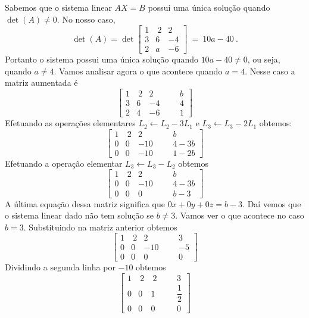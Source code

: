 \begin{solution}  Sabemos que o sistema linear $AX=B$ possui uma única solução quando $\det(A) \neq 0$. No nosso caso,
$$ \det(A) = \det\left[\begin{array}{rrr}
  1 & \  2  &   2  \\
  3 &    6  &  -4  \\ 
  2 &    a  &  -6  \end{array}\right]\ =\ 10a-40\ . $$
Portanto o sistema possui uma única solução quando $10a-40 \neq 0$, ou seja, quando $a\neq 4$.
Vamos analisar agora o que acontece quando $a=4$. Nesse caso a matriz aumentada é
$$ \left[\begin{array}{rrrr|rr}
  1 & \ 2 &    2 & & &   b  \\
  3 &   6 &   -4 & & &   4  \\ 
  2 &   4 &   -6 & & &   1  \end{array}\right] $$
Efetuando as operações elementares $L_2 \leftarrow L_2 - 3L_1$ e $L_3 \leftarrow L_3 - 2L_1$ obtemos:
$$ \left[\begin{array}{rrrr|rc}
  1 & \ 2 &     2 & & &   b  \\
  0 &   0 &   -10 & & &   4-3b  \\ 
  0 &   0 &   -10 & & &   1-2b  \end{array}\right] $$
Efetuando a operação elementar $L_3 \leftarrow L_3 - L_2$ obtemos
$$ \left[\begin{array}{rrrr|rc}
  1 & \ 2 &     2 & & &   b  \\
  0 &   0 &   -10 & & &   4-3b  \\ 
  0 &   0 &     0 & & &   b-3  \end{array}\right] $$
A última equação dessa matriz significa que $0x+0y+0z=b-3$. Daí vemos que o sistema linear dado não tem solução se $b \neq 3$. Vamos ver o que acontece no caso $b=3$. Substituindo na matriz anterior obtemos
$$ \left[\begin{array}{rrrr|rr}
  1 & \ 2 &     2 & & &   3  \\
  0 &   0 &   -10 & & &  -5  \\ 
  0 &   0 &     0 & & &   0  \end{array}\right] $$
Dividindo a segunda linha por $-10$ obtemos
$$ \left[\begin{array}{rrrr|rc}
  1 & \ 2 &  \ 2 & & &   3             \\[5pt]
  0 &   0 &    1 & & &   \dfrac{1}{2}  \\[9pt] 
  0 &   0 &    0 & & &   0             \end{array}\right] $$

\end{solution}

